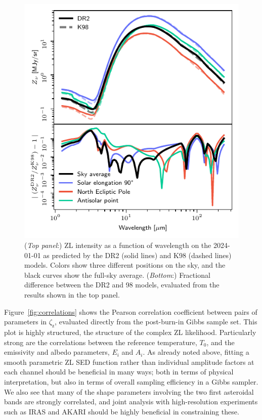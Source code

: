 \documentclass[twocolumn]{aa}
\begin{document}
\begin{figure}
    \centering
    \includegraphics[width=\columnwidth]{figs/zodi_intensity.pdf}
    \caption{(\textit{Top panel}:) ZL intensity as a function of wavelength on the 2024-01-01
      as predicted by the DR2 (solid lines) and K98 (dashed lines)
      models. Colors show
      three different positions on the sky, and the black curves show
      the full-sky average. (\textit{Bottom}:) Fractional difference
      between the DR2 and 98 models, evaluated from the results
      shown in the top panel.
    }
    \label{fig:zodi-intensity}
\end{figure}

Figure~\ref{fig:correlations} shows the Pearson correlation
coefficient between pairs of parameters in $\zeta_{\mathrm{z}}$,
evaluated directly from the post-burn-in Gibbs sample set. This plot
is highly structured, the structure of the 
complex ZL likelihood. Particularly strong are the correlations
between the reference temperature, $T_0$, and the emissivity and
albedo parameters, $E_i$ and $A_i$. As already noted above, fitting a
smooth parametric ZL SED function rather than individual amplitude
factors at each channel should be beneficial in many ways; both in
terms of physical interpretation, but also in terms of overall
sampling efficiency in a Gibbs sampler. We also see that many of the
shape parameters involving the two first asteroidal bands are strongly
correlated, and joint analysis with high-resolution experiments such
as IRAS and AKARI \citep{akari, akari2} should be highly beneficial in constraining these.
\end{document}
